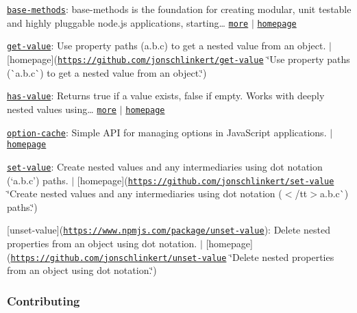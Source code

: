 \begin{DoxyItemize}
\item \href{https://www.npmjs.com/package/base-methods}{\tt base-\/methods}\+: base-\/methods is the foundation for creating modular, unit testable and highly pluggable node.\+js applications, starting… \href{https://github.com/jonschlinkert/base-methods}{\tt more} $\vert$ \href{https://github.com/jonschlinkert/base-methods}{\tt homepage}
\item \href{https://www.npmjs.com/package/get-value}{\tt get-\/value}\+: Use property paths ({\ttfamily a.\+b.\+c}) to get a nested value from an object. $\vert$ \mbox{[}homepage\mbox{]}(\href{https://github.com/jonschlinkert/get-value}{\tt https\+://github.\+com/jonschlinkert/get-\/value} \char`\"{}\+Use property paths (\`{}a.\+b.\+c\`{}) to get a nested value from an object.\char`\"{})
\item \href{https://www.npmjs.com/package/has-value}{\tt has-\/value}\+: Returns true if a value exists, false if empty. Works with deeply nested values using… \href{https://github.com/jonschlinkert/has-value}{\tt more} $\vert$ \href{https://github.com/jonschlinkert/has-value}{\tt homepage}
\item \href{https://www.npmjs.com/package/option-cache}{\tt option-\/cache}\+: Simple A\+PI for managing options in Java\+Script applications. $\vert$ \href{https://github.com/jonschlinkert/option-cache}{\tt homepage}
\item \href{https://www.npmjs.com/package/set-value}{\tt set-\/value}\+: Create nested values and any intermediaries using dot notation (`\textquotesingle{}a.\+b.\+c'{\ttfamily ) paths. $\vert$ \mbox{[}homepage\mbox{]}(\href{https://github.com/jonschlinkert/set-value}{\tt https\+://github.\+com/jonschlinkert/set-\/value} \char`\"{}\+Create nested values and any intermediaries using dot notation ($<$/tt$>$\textquotesingle{}a.\+b.\+c\textquotesingle{}\`{}) paths.\char`\"{})}
\item {\ttfamily \mbox{[}unset-\/value\mbox{]}(\href{https://www.npmjs.com/package/unset-value}{\tt https\+://www.\+npmjs.\+com/package/unset-\/value})\+: Delete nested properties from an object using dot notation. $\vert$ \mbox{[}homepage\mbox{]}(\href{https://github.com/jonschlinkert/unset-value}{\tt https\+://github.\+com/jonschlinkert/unset-\/value} \char`\"{}\+Delete nested properties from an object using dot notation.\char`\"{})}
\end{DoxyItemize}

{\ttfamily \subsubsection*{Contributing}}

